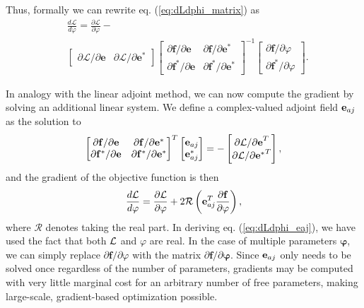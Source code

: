 %
Thus, formally we can rewrite eq. (\ref{eq:dLdphi_matrix}) as
%
\begin{align}
& \frac{d\mathcal{L}}{d\varphi} = \frac{\partial\mathcal{L}}{\partial\varphi} - \label{eq:dLdphi}\\
& \begin{bmatrix}
\partial\mathcal{L} / \partial\mathbf{e} &
\partial\mathcal{L} / \partial\mathbf{e}^*
\end{bmatrix}
\begin{bmatrix}
\partial \mathbf{f} / \partial \mathbf{e} &
\partial \mathbf{f} / \partial \mathbf{e}^* \\
\partial \mathbf{f}^* / \partial \mathbf{e} &
\partial \mathbf{f}^* / \partial \mathbf{e}^*
\end{bmatrix}^{-1}
\begin{bmatrix}
\partial \mathbf{f} / \partial \varphi \\ \partial \mathbf{f}^* / \partial \varphi
\end{bmatrix}.
\nonumber
\end{align}

In analogy with the linear adjoint method, we can now compute the gradient by solving an additional linear system.  We define a complex-valued adjoint field $\mathbf{e}_{aj}$ as the solution to
%
\begin{align}
\begin{bmatrix}
\partial \mathbf{f} / \partial \mathbf{e} &
\partial \mathbf{f} / \partial \mathbf{e}^* \\
\partial \mathbf{f}^* / \partial \mathbf{e} &
\partial \mathbf{f}^* / \partial \mathbf{e}^*
\end{bmatrix}^{T}
\begin{bmatrix}
\mathbf{e}_{aj} \\ \mathbf{e}_{aj}^*
\end{bmatrix} = - \begin{bmatrix}
{\partial\mathcal{L} / \partial\mathbf{e}}^T \\
{\partial\mathcal{L} / \partial\mathbf{e}^*}^T
\end{bmatrix}, 
\label{eq:eaj}
\end{align}
%
and the gradient of the objective function is then
%
\begin{align}
\frac{d\mathcal{L}}{d\varphi} = \frac{\partial\mathcal{L}}{\partial\varphi} + 2\mathcal{R}\left(
\mathbf{e}_{aj}^T
\frac{\partial \mathbf{f}} { \partial \varphi} \right)
\label{eq:dLdphi_eaj},
\end{align}
%
where $\mathcal{R}$ denotes taking the real part. In deriving eq. (\ref{eq:dLdphi_eaj}), we have used the fact that both $\mathcal{L}$ and $\varphi$ are real.  In the case of multiple parameters $\bm{\varphi}$, we can simply replace $\partial \mathbf{f} / \partial \varphi$ with the matrix $\partial \mathbf{f} / \partial \bm{\varphi}$. Since $\mathbf{e}_{aj}$ only needs to be solved once regardless of the number of parameters, gradients may be computed with very little marginal cost for an arbitrary number of free parameters, making large-scale, gradient-based optimization possible.

